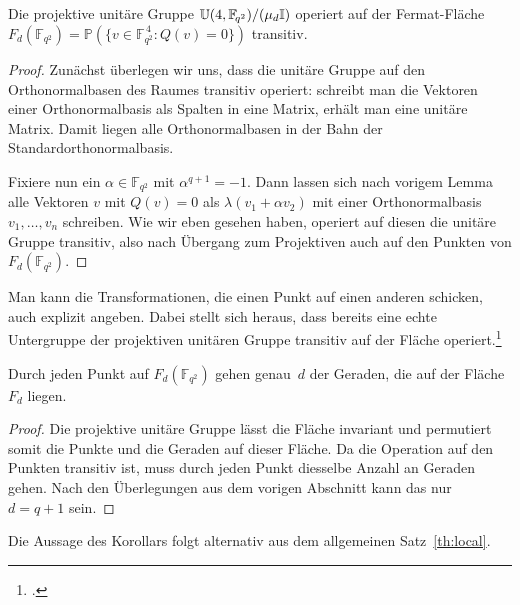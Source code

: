 \begin{theorem}
Die projektive unitäre Gruppe $\mathbb U(4,\mathbb F_{\!q^2}) / (\mu_d \mathbb I)$ operiert auf der Fermat-Fläche $F_d(\mathbb F_{\!q^2}) = \mathbb P(\{v \in \mathbb F_{\!q^2}^{\,4}: Q(v) = 0\})$ transitiv.
\end{theorem}
\begin{proof}
Zunächst überlegen wir uns, dass die unitäre Gruppe auf den Orthonormalbasen des Raumes transitiv operiert: schreibt man die Vektoren einer Orthonormalbasis als Spalten in eine Matrix, erhält man eine unitäre Matrix. Damit liegen alle Orthonormalbasen in der Bahn der Standardorthonormalbasis.

Fixiere nun ein $\alpha \in \mathbb F_{q^2}$ mit $\alpha^{q+1} = -1$. Dann lassen sich nach vorigem Lemma alle Vektoren $v$ mit $Q(v) = 0$ als $\lambda (v_1 + \alpha v_2)$ mit einer Orthonormalbasis $v_1, \dots, v_n$ schreiben. Wie wir eben gesehen haben, operiert auf diesen die unitäre Gruppe transitiv, also nach Übergang zum Projektiven auch auf den Punkten von $F_d(\mathbb F_{q^2})$.
\end{proof}
\begin{remarks}
Man kann die Transformationen, die einen Punkt auf einen anderen schicken, auch explizit angeben. Dabei stellt sich heraus, dass bereits eine echte Untergruppe der projektiven unitären Gruppe transitiv auf der Fläche operiert.\footcite[S.~44, 3)]{Dieudonne}
\end{remarks}

\begin{coroll} \label{cor:dlines}
Durch jeden Punkt auf $F_d(\mathbb F_{\!q^2})$ gehen genau~$d$ der Geraden, die auf der Fläche~$F_d$ liegen.
\end{coroll}
\begin{proof}
Die projektive unitäre Gruppe lässt die Fläche invariant und permutiert somit die Punkte und die Geraden auf dieser Fläche. Da die Operation auf den Punkten transitiv ist, muss durch jeden Punkt diesselbe Anzahl an Geraden gehen. Nach den Überlegungen aus dem vorigen Abschnitt kann das nur $d=q+1$ sein.
\end{proof}
\begin{remarks}
Die Aussage des Korollars folgt alternativ aus dem allgemeinen Satz~\ref{th:local}.
\end{remarks}

